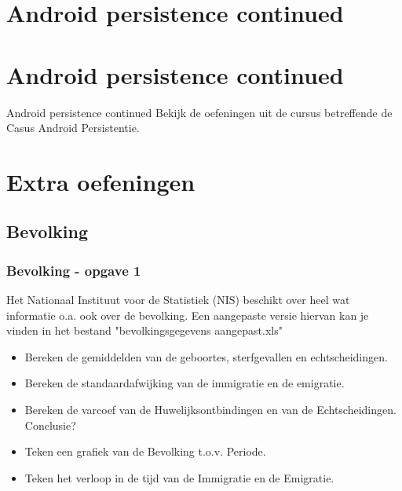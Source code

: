 \documentclass{beamer}
\newif\ifoplossing
\begin{document}
\section{Android persistence continued}
\section{Android persistence continued}
\begin{frame}{Android persistence continued}
	Bekijk de oefeningen uit de cursus betreffende de Casus Android Persistentie. 

\end{frame}


\section{Extra oefeningen}
\subsection{Bevolking}

\begin{frame}
	\frametitle{Bevolking - opgave 1}
	Het Nationaal Instituut voor de Statistiek (NIS) beschikt over heel wat informatie o.a. ook over de bevolking. Een aangepaste versie hiervan kan je vinden in het bestand "bevolkingsgegevens aangepast.xls"
	\begin{itemize}
		\item Bereken de gemiddelden van de geboortes, sterfgevallen en echtscheidingen.
		\item Bereken de standaardafwijking van de immigratie en de emigratie.
		\item Bereken de varcoef van de Huwelijksontbindingen en van de Echtscheidingen. Conclusie?
		\item Teken een grafiek van de Bevolking t.o.v. Periode.
		\item Teken het verloop in de tijd van de Immigratie en de Emigratie.
\end{itemize}
\end{frame}

\ifoplossing
\begin{frame}[fragile]
	
\end{frame}
	
\fi
\end{document}
